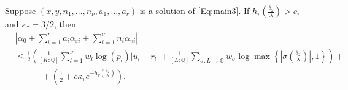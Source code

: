 \begin{lemma}\label{lem:archellest}
Suppose $(x,y, n_1, \dots, n_{\nu}, a_1, \dots, a_r)$ is a solution of \eqref{Eq:main3}. If ${h_{\tau} \left(\frac{\delta_2}{\lambda}\right) > c_{\tau}}$ and $\kappa_\tau=3/2$, then  
\begin{align*}
&\left|\alpha_0+\sum_{i = 1}^r a_i \alpha_{\varepsilon i} + \sum_{i = 1}^{\nu} n_i \alpha_{\gamma i}\right|\\
	& \leq \frac{1}{2}\left(\frac{1}{[K:\mathbb{Q}]}\sum_{l = 1}^{\nu}w_l \log(p_l)|u_l - r_l| + \frac{1}{[L:\mathbb{Q}]}\sum_{\sigma :L \to \mathbb{C}} w_{\sigma}\log \max \left\{ \left|\sigma\left(\frac{\delta_2}{\lambda}\right)\right|, 1\right\} \right) + \\
	& \quad \quad \quad + \left(\frac{1}{2} + c\kappa_{\tau}e^{-h_{\tau}\left(\frac{\delta_2}{\lambda}\right)}\right).
\end{align*} 
\end{lemma}

